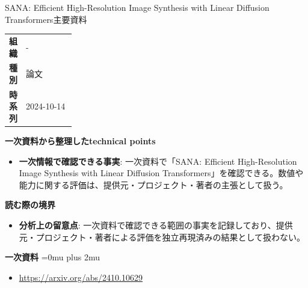 \begin{technicalnote}{SANA: Efficient High-Resolution Image Synthesis with Linear Diffusion Transformers}{主要資料}
\begingroup
\begin{tabularx}{\linewidth}{@{}>{\bfseries}p{0.22\linewidth}X@{}}
組織 & - \\
種別 & 論文 \\
時系列 & 2024-10-14 \\
\end{tabularx}
\smallskip
{\bfseries 一次資料から整理したtechnical points}
\begin{itemize}[leftmargin=1.5em,itemsep=0.35em]
\item \textbf{一次情報で確認できる事実}: 一次資料で「SANA: Efficient High-Resolution Image Synthesis with Linear Diffusion Transformers」を確認できる。数値や能力に関する評価は、提供元・プロジェクト・著者の主張として扱う。
\end{itemize}
\begin{minipage}{\linewidth}
{\bfseries 読む際の境界}
\begin{itemize}[leftmargin=1.5em,itemsep=0.35em]
\item \textbf{分析上の留意点}: 一次資料で確認できる範囲の事実を記録しており、提供元・プロジェクト・著者による評価を独立再現済みの結果として扱わない。
\end{itemize}
\begin{samepage}
{\bfseries 一次資料}
\begingroup\sloppy
\Urlmuskip=0mu plus 2mu\relax
\begin{itemize}[leftmargin=1.5em,itemsep=0.25em]
\item {\scriptsize\url{https://arxiv.org/abs/2410.10629}}
\end{itemize}
\endgroup
\end{samepage}
\end{minipage}
\endgroup
\end{technicalnote}
\medskip


